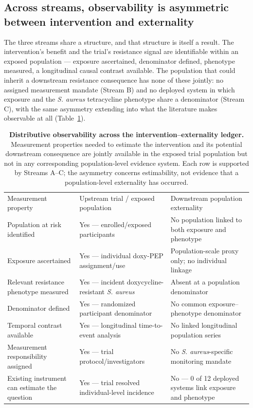 \documentclass[10pt,letterpaper]{article}
\newlength\savedwidth
\newcommand\thickhline{\noalign{\global\savedwidth\arrayrulewidth\global\arrayrulewidth 2pt}%
\hline
\noalign{\global\arrayrulewidth\savedwidth}}
\begin{document}
\subsection*{Across streams, observability is asymmetric between intervention and externality}

The three streams share a structure, and that structure is itself a
result. The intervention's benefit and the trial's resistance signal are
identifiable within an exposed population --- exposure ascertained,
denominator defined, phenotype measured, a longitudinal causal contrast
available. The population that could inherit a downstream resistance
consequence has none of these jointly: no assigned measurement mandate
(Stream B) and no deployed system in which exposure and the \emph{S.
aureus} tetracycline phenotype share a denominator (Stream C), with the
same asymmetry extending into what the literature makes observable at all (Table~\ref{table1}).

\begin{table}[!ht]
\centering
\small
\caption{\textbf{Distributive observability across the intervention--externality ledger.}
Measurement properties needed to estimate the intervention and its potential
downstream consequence are jointly available in the exposed trial population
but not in any corresponding population-level evidence system. Each row is
supported by Streams A--C; the asymmetry concerns estimability, not evidence
that a population-level externality has occurred.}
\label{table1}
\renewcommand{\arraystretch}{1.15}
\begin{tabularx}{\textwidth}{|p{}|>{\raggedright\arraybackslash}X|>{\raggedright\arraybackslash}X|}
\hline
Measurement property & Upstream trial / exposed population & Downstream population externality \\ \thickhline
Population at risk identified & Yes --- enrolled/exposed participants & No population linked to both exposure and phenotype \\ \hline
Exposure ascertained & Yes --- individual doxy-PEP assignment/use & Population-scale proxy only; no individual linkage \\ \hline
Relevant resistance phenotype measured & Yes --- incident doxycycline-resistant \emph{S. aureus} & Absent at a population denominator \\ \hline
Denominator defined & Yes --- randomized participant denominator & No common exposure--phenotype denominator \\ \hline
Temporal contrast available & Yes --- longitudinal time-to-event analysis & No linked longitudinal population series \\ \hline
Measurement responsibility assigned & Yes --- trial protocol/investigators & No \emph{S. aureus}-specific monitoring mandate \\ \hline
Existing instrument can estimate the question & Yes --- trial resolved individual-level incidence & No --- 0 of 12 deployed systems link exposure and phenotype \\ \hline
\end{tabularx}
\renewcommand{\arraystretch}{1}
\end{table}
\end{document}
